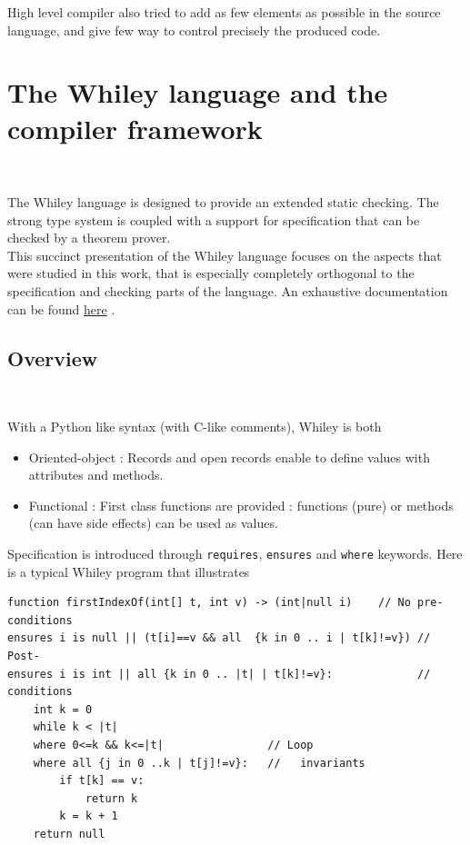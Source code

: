 \documentclass[10pt,a4paper]{article}
\renewcommand{\indent}{~\\\vspace{-.8cm}}
\newcommand{\whileyLine}{\lstinline[language=Whiley,basicstyle=\normalsize\ttfamily]}
\begin{document}
High level compiler also tried to add as few elements as possible in the source language, and give few way to control precisely  the produced code.


\section{The Whiley language and the compiler framework}
\indent

The Whiley language is designed to provide an extended static checking. The strong type system is coupled with a support for specification that can be checked by a theorem prover.\\ 

This succinct presentation of the Whiley language focuses on the aspects that were studied in this work, that is especially completely orthogonal to the specification and checking parts of the language. An exhaustive documentation can be found \href{http://www.whiley.org/}{here} \cite{WhileySpec}.


\subsection{Overview}\indent

With a Python like syntax (with C-like comments), Whiley is both
\begin{itemize}
\item Oriented-object : Records and open records enable to define values with attributes and methods.
\item Functional : First class functions are provided : functions (pure) or methods (can have side effects) can be used as values.
\end{itemize}

Specification is introduced through \whileyLine{requires}, \whileyLine{ensures} and \whileyLine{where} keywords. Here is a typical Whiley program that illustrates 

\begin{lstlisting}[language=Whiley]
function firstIndexOf(int[] t, int v) -> (int|null i)    // No pre-conditions
ensures i is null || (t[i]==v && all  {k in 0 .. i | t[k]!=v}) // Post-
ensures i is int || all {k in 0 .. |t| | t[k]!=v}:             //  conditions
    int k = 0
    while k < |t| 
    where 0<=k && k<=|t|                // Loop
    where all {j in 0 ..k | t[j]!=v}:   //   invariants
        if t[k] == v:
            return k
        k = k + 1
    return null
\end{lstlisting}
\end{document}
